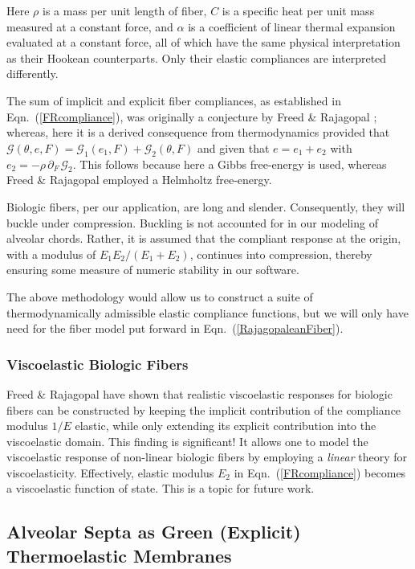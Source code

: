 Here $\rho$ is a mass per unit length of fiber, $C$ is a specific heat per unit mass measured at a constant force, and $\alpha$ is a coefficient of linear thermal expansion evaluated at a constant force, all of which have the same physical interpretation as their Hookean counterparts.  Only their elastic compliances are interpreted differently.

The sum of implicit and explicit fiber compliances, as established in Eqn.~(\ref{FRcompliance}), was originally a conjecture by Freed \& Rajagopal \cite{FreedRajagopal16}; whereas, here it is a derived consequence from thermo\-dynamics provided that $\mathcal{G} ( \theta , e , F) = \mathcal{G}_1 ( e_1 , F ) + \mathcal{G}_2 ( \theta , F )$ and given that $e = e_1 + e_2$ with $e_2 = - \rho \, \partial_{F\,} \mathcal{G}_2$.  This follows because here a Gibbs free-energy is used, whereas Freed \& Rajagopal employed a Helmholtz free-energy.

Biologic fibers, per our application, are long and slender.  Consequently, they will buckle under compression.  Buckling is not accounted for in our modeling of alveolar chords.  Rather, it is assumed that the compliant response at the origin, with a modulus of $E_1 E_2 / ( E_1 + E_2 )$, continues into compression, thereby ensuring some measure of numeric stability in our software.

The above methodology would allow us to construct a suite of thermo\-dynamically admissible elastic compliance functions, but we will only have need for the fiber model put forward in Eqn.~(\ref{RajagopaleanFiber}).

\subsubsection{Viscoelastic Biologic Fibers}

Freed \& Rajagopal \cite{FreedRajagopal16a} have shown that realistic visco\-elastic responses for biologic fibers can be constructed by keeping the implicit contribution of the compliance modulus $1/E$ elastic, while only extending its explicit contribution into the visco\-elastic domain.  This finding is significant!  It allows one to model the visco\-elastic response of non-linear biologic fibers by employing a \textit{linear\/} theory for visco\-elasticity.  Effectively, elastic modulus $E_2$ in Eqn.~(\ref{FRcompliance}) becomes a visco\-elastic function of state.  This is a topic for future work.

\subsection{Alveolar Septa as Green (Explicit) Thermoelastic Membranes}

